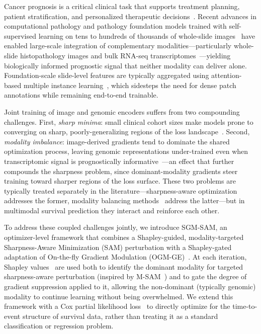 \documentclass[runningheads]{llncs}
\begin{document}
Cancer prognosis is a critical clinical task that supports treatment
planning, patient stratification, and personalized therapeutic
decisions~\cite{who2024}. Recent advances in computational pathology
and pathology foundation models trained with self-supervised learning
on tens to hundreds of thousands of whole-slide
images~\cite{chen2024uni, vorontsov2024virchow, lu2024conch} have
enabled large-scale integration of complementary
modalities---particularly whole-slide histopathology images and bulk
RNA-seq transcriptomes~\cite{chen2021, chen2022porpoise,
acosta2022}---yielding biologically informed prognostic signal that
neither modality can deliver alone. Foundation-scale slide-level
features are typically aggregated using attention-based multiple
instance learning~\cite{lu2021abmil}, which sidesteps the need for
dense patch annotations while remaining end-to-end trainable.

Joint training of image and genomic encoders suffers from two
compounding challenges.
First, \textit{sharp minima}: small clinical cohort sizes
make models prone to converging on sharp, poorly-generalizing regions
of the loss landscape~\cite{keskar2017largebatch, hochreiter1997flat}.
Second, \textit{modality imbalance}: image-derived gradients tend to
dominate the shared optimization process, leaving genomic
representations under-trained even when transcriptomic signal is
prognostically informative~\cite{wang2020what, peng2022ogm}---an
effect that further compounds the sharpness problem, since
dominant-modality gradients steer training toward sharper
regions of the loss surface. These two problems are typically
treated separately in the literature---sharpness-aware
optimization~\cite{foret2021sam} addresses the former, modality
balancing methods~\cite{peng2022ogm, du2023unimodal, fan2023pmr}
address the latter---but in
multimodal survival prediction they interact and reinforce each other.

To address these coupled challenges jointly, we introduce SGM-SAM, an
optimizer-level framework that combines a Shapley-guided,
modality-targeted Sharpness-Aware Minimization (SAM) perturbation
with a Shapley-gated adaptation of On-the-fly Gradient Modulation
(OGM-GE)~\cite{peng2022ogm}. At each iteration, Shapley
values~\cite{shapley1953} are used both to identify the dominant
modality for targeted sharpness-aware perturbation (inspired by
M-SAM~\cite{rajoli2025msam}) and to gate the degree of gradient
suppression applied to it, allowing the non-dominant (typically
genomic) modality to continue learning without being overwhelmed. We
extend this framework with a Cox partial likelihood
loss~\cite{cox1972, katzman2018} to directly optimize for the time-to-event
structure of survival data, rather than treating it as a standard
classification or regression problem.
\end{document}
